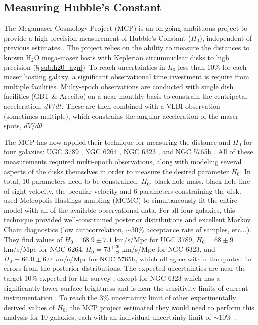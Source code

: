 \subsection{Measuring Hubble's Constant}
\label{sub:h2o_cosmo}

The Megamaser Cosmology Project (MCP) is an on-going ambituous project to provide a high-precision measurement of Hubble's Constant ($H_0$), independent of previous estimates \citep{reid2009_mmproject_I}. The project relies on the ability to measure the distances to known H$_2$O mega-maser hosts with Keplerian circumnuclear disks to high precision (\S\ref{sub:h20_agn}). To reach uncertainties in $H_0$ less than 10\% for each maser hosting galaxy, a significant observational time investment is require from multiple facilities. Multy-epoch observations are conducted with single dish facilities (GBT \& Arecibo) on a near monthly basis to constrain the centripetal acceleration, $dV/dt$. These are then combined with a VLBI observation (sometimes multiple), which constrains the angular acceleration of the maser spots, $dV/d\theta$.

The MCP has now applied their technique for measuring the distance and $H_0$ for four galaxies: UGC 3789 \citep{Braatz_2010,reid2013_mmproject_IV}, NGC 6264 \citep{Kuo_2013}, NGC 6323 \citep{kuo2015_mmproject_VI}, and NGC 5765b \citep{gao2015}. All of these measurements required multi-epoch observations, along with modeling several aspects of the disks themselves in order to measure the desired parameter $H_0$. In total, 10 parameters need to be constrained: $H_0$, black hole mass, black hole line-of-sight velocity, the peculiar velocity and 6 parameters constraining the disk. \citet{reid2013_mmproject_IV} used Metropolis-Hastings sampling (MCMC) to simultaneously fit the entire model with all of the available observational data. For all four galaxies, this technique provided well-constrained posterior distributions and excellent Markov Chain diagnostics (low autocorrelation, $\sim 30\%$ acceptance rate of samples, etc...). They find values of $H_0=68.9\pm7.1$ km/s/Mpc for UGC 3789, $H_0=68\pm9$ km/s/Mpc for NGC 6264, $H_0=73^{+26}_{-22}$ km/s/Mpc for NGC 6323, and $H_0=66.0\pm6.0$ km/s/Mpc for NGC 5765b, which all agree within the quoted 1$\sigma$ errors from the posterior distributions. The expected uncertainties are near the target 10\% expected for the survey \citep{reid2013_mmproject_IV}, except for NGC 6323 which has a significantly lower surface brightness and is near the sensitivity limits of current instrumentation \citep{kuo2015_mmproject_VI}. To reach the 3\% uncertainty limit of other experimentally derived values of $H_0$, the MCP project estimated they would need to perform this analysis for 10 galaxies, each with an individual uncertainty limit of $\sim 10\%$ \citep{reid2013_mmproject_IV}.  

